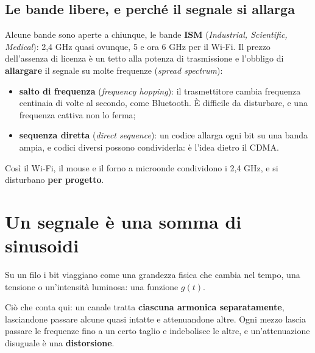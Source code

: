 \subsection{Le bande libere, e perché il segnale si allarga}

Alcune bande sono aperte a chiunque, le bande \textbf{ISM} (\emph{Industrial, Scientific, Medical}): 2,4 GHz quasi ovunque, 5 e ora
6 GHz per il Wi-Fi. Il prezzo dell'assenza di licenza è un tetto alla potenza di trasmissione e l'obbligo di \textbf{allargare} il
segnale su molte frequenze (\emph{spread spectrum}):

\begin{itemize}
    \item \textbf{salto di frequenza} (\emph{frequency hopping}): il trasmettitore cambia frequenza centinaia di volte al secondo, come
          Bluetooth. È difficile da disturbare, e una frequenza cattiva non lo ferma;
    \item \textbf{sequenza diretta} (\emph{direct sequence}): un codice allarga ogni bit su una banda ampia, e codici diversi possono
          condividerla: è l'idea dietro il CDMA.
\end{itemize}

Così il Wi-Fi, il mouse e il forno a microonde condividono i 2,4 GHz, e si disturbano \textbf{per progetto}.

\section{Un segnale è una somma di sinusoidi}

Su un filo i bit viaggiano come una grandezza fisica che cambia nel tempo, una tensione o un'intensità luminosa: una funzione
$g(t)$.


Ciò che conta qui: un canale tratta \textbf{ciascuna armonica separatamente}, lasciandone passare alcune quasi intatte e attenuandone
altre. Ogni mezzo lascia passare le frequenze fino a un certo taglio e indebolisce le altre, e un'attenuazione disuguale è una
\textbf{distorsione}.

